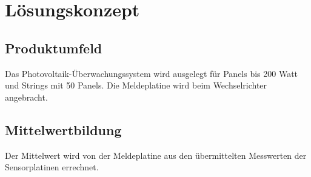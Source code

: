 \section{L\"osungskonzept}
\subsection{Produktumfeld}
Das Photovoltaik-Überwachungssystem wird ausgelegt für Panels bis 200 Watt und Strings mit 50 Panels. Die Meldeplatine wird beim Wechselrichter angebracht.
\subsection{Mittelwertbildung}
Der Mittelwert wird von der Meldeplatine aus den übermittelten Messwerten der Sensorplatinen errechnet. 